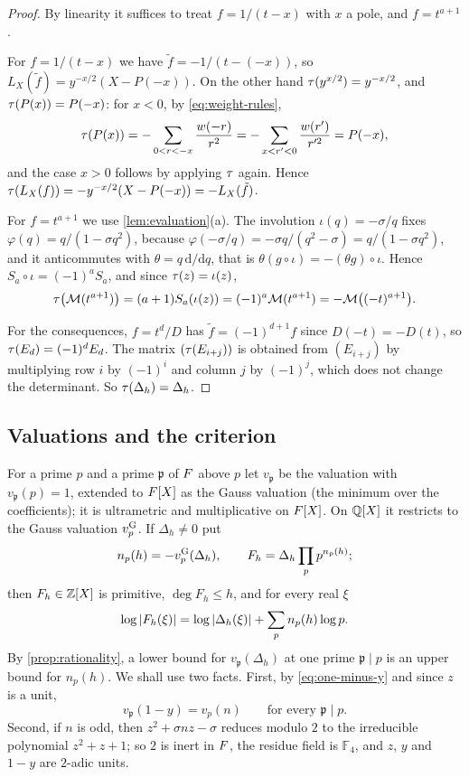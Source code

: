 \begin{proof}
By linearity it suffices to treat $f=1/(t-x)$ with $x$ a pole, and $f=t^{a+1}$.

For $f=1/(t-x)$ we have $\tilde f=-1/(t-(-x))$, so $L_X(\tilde f)=y^{-x/2}(X-P(-x))$. On the other
hand $\tau(y^{x/2})=y^{-x/2}$, and $\tau(P(x))=P(-x)$: for $x<0$, by \eqref{eq:weight-rules},
\[
\tau(P(x))=-\sum_{0<r<-x}\frac{w(-r)}{r^2}=-\sum_{x<r'<0}\frac{w(r')}{r'^2}=P(-x),
\]
and the case $x>0$ follows by applying $\tau$ again. Hence
$\tau(L_X(f))=-y^{-x/2}(X-P(-x))=-L_X(\tilde f)$.

For $f=t^{a+1}$ we use \cref{lem:evaluation}(a). The involution $\iota(q)=-\sigma/q$ fixes
$\varphi(q)=q/(1-\sigma q^2)$, because
$\varphi(-\sigma/q)=-\sigma q/(q^2-\sigma)=q/(1-\sigma q^2)$, and it anticommutes with
$\theta=q\,\mathrm d/\mathrm dq$, that is $\theta(g\circ\iota)=-(\theta g)\circ\iota$. Hence
$S_a\circ\iota=(-1)^aS_a$, and since $\tau(z)=\iota(z)$,
\[
\tau\bigl(\mathcal{M}(t^{a+1})\bigr)=(a+1)S_a(\iota(z))=(-1)^a\mathcal{M}(t^{a+1})=-\mathcal{M}\bigl((-t)^{a+1}\bigr).
\]

For the consequences, $f=t^d/D$ has $\tilde f=(-1)^{d+1}f$ since $D(-t)=-D(t)$, so
$\tau(E_d)=(-1)^dE_d$. The matrix $(\tau(E_{i+j}))$ is obtained from $(E_{i+j})$ by multiplying
row $i$ by $(-1)^i$ and column $j$ by $(-1)^j$, which does not change the determinant. So
$\tau(\Delta_h)=\Delta_h$.
\end{proof}

\subsection{Valuations and the criterion}\label{subsec:criterion}

For a prime $p$ and a prime $\mathfrak p$ of $F$ above $p$ let $v_{\mathfrak p}$ be the
valuation with $v_{\mathfrak p}(p)=1$, extended to $F[X]$ as the Gauss valuation (the minimum
over the coefficients); it is ultrametric and multiplicative on $F[X]$. On $\mathbb{Q}[X]$ it restricts
to the Gauss valuation $v_{p}^{\mathrm{G}}$. If $\Delta_h\ne0$ put
\[
n_p(h)=-v_{p}^{\mathrm{G}}(\Delta_h),\qquad F_h=\Delta_h\prod_pp^{n_p(h)} ;
\]
then $F_h\in\mathbb{Z}[X]$ is primitive, $\deg F_h\le h$, and for every real $\xi$
\begin{equation}\label{eq:size-identity}
\log\left\lvert F_h(\xi)\right\rvert=\log\left\lvert \Delta_h(\xi)\right\rvert+\sum_pn_p(h)\log p .
\end{equation}
By \cref{prop:rationality}, a lower bound for $v_{\mathfrak p}(\Delta_h)$ at one prime
$\mathfrak p\mid p$ is an upper bound for $n_p(h)$. We shall use two facts. First, by
\eqref{eq:one-minus-y} and since $z$ is a unit,
\begin{equation}\label{eq:val-one-minus-y}
v_{\mathfrak p}(1-y)=v_p(n)\qquad\text{for every }\mathfrak p\mid p .
\end{equation}
Second, if $n$ is odd, then $z^2+\sigma nz-\sigma$ reduces modulo $2$ to the irreducible
polynomial $z^2+z+1$; so $2$ is inert in $F$, the residue field is $\mathbb F_4$, and $z$, $y$
and $1-y$ are $2$-adic units.

